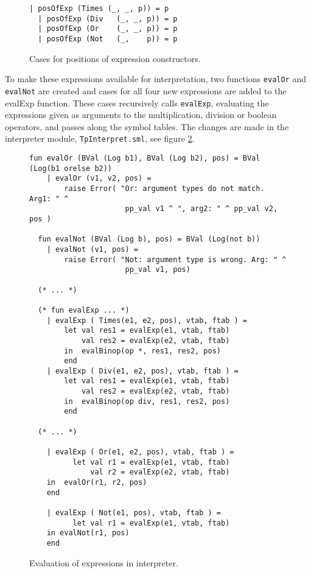 \begin{figure}[H]
  \begin{lstlisting}[style=MLStyle]
  | posOfExp (Times (_, _, p)) = p
  | posOfExp (Div   (_, _, p)) = p
  | posOfExp (Or    (_, _, p)) = p
  | posOfExp (Not   (_,    p)) = p
  \end{lstlisting}
  \caption{Cases for positions of expression constructors.}
  \label{fig_expPos}
\end{figure}

\noindent
To make these expressions available for interpretation, two functions
\verb|evalOr| and \verb|evalNot| are created and cases for all four new
expressions are added to the evalExp function. These cases recursively calls
\verb|evalExp|, evaluating the expressions given as arguments to the
multiplication, division or boolean operators, and passes along the symbol
tables. The changes are made in the interpreter module, \verb|TpInterpret.sml|,
see figure \ref{fig_expInterpret}.
\begin{figure}[H]
  \begin{lstlisting}[style=MLStyle]
  fun evalOr (BVal (Log b1), BVal (Log b2), pos) = BVal (Log(b1 orelse b2))
    | evalOr (v1, v2, pos) =
        raise Error( "Or: argument types do not match. Arg1: " ^
                      pp_val v1 ^ ", arg2: " ^ pp_val v2, pos )

  fun evalNot (BVal (Log b), pos) = BVal (Log(not b))
    | evalNot (v1, pos) =
        raise Error( "Not: argument type is wrong. Arg: " ^
                      pp_val v1, pos)

  (* ... *)

  (* fun evalExp ... *)
    | evalExp ( Times(e1, e2, pos), vtab, ftab ) =
        let val res1 = evalExp(e1, vtab, ftab)
            val res2 = evalExp(e2, vtab, ftab)
        in  evalBinop(op *, res1, res2, pos)
        end
    | evalExp ( Div(e1, e2, pos), vtab, ftab ) =
        let val res1 = evalExp(e1, vtab, ftab)
            val res2 = evalExp(e2, vtab, ftab)
        in  evalBinop(op div, res1, res2, pos)
        end

  (* ... *)

    | evalExp ( Or(e1, e2, pos), vtab, ftab ) =
          let val r1 = evalExp(e1, vtab, ftab)
              val r2 = evalExp(e2, vtab, ftab)
    in  evalOr(r1, r2, pos)
    end

    | evalExp ( Not(e1, pos), vtab, ftab ) =
          let val r1 = evalExp(e1, vtab, ftab)
    in evalNot(r1, pos)
    end
  \end{lstlisting}
  \caption{Evaluation of expressions in interpreter.}
  \label{fig_expInterpret}
\end{figure}

